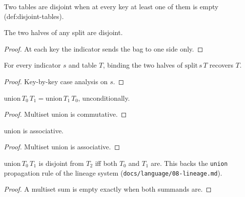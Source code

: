 \begin{definition}
  \label{def:disjoint}\leanok
  Two tables are disjoint when at every key at least one of them is
  empty (def:disjoint-tables).
\end{definition}

\begin{theorem}
  \label{thm:split-disjoint}\leanok
  The two halves of any split are disjoint.
\end{theorem}
\begin{proof}\leanok
  At each key the indicator sends the bag to one side only.
\end{proof}

\begin{theorem}
  \label{thm:union-split}\leanok
  For every indicator $s$ and table $T$, binding the two halves of
  $\mathrm{split}\,s\,T$ recovers $T$.
\end{theorem}
\begin{proof}\leanok
  Key-by-key case analysis on $s$.
\end{proof}

\begin{theorem}
  \label{thm:union-comm}\leanok
  $\mathrm{union}\,T_0\,T_1 = \mathrm{union}\,T_1\,T_0$, unconditionally.
\end{theorem}
\begin{proof}\leanok
  Multiset union is commutative.
\end{proof}

\begin{theorem}
  \label{thm:union-assoc}\leanok
  $\mathrm{union}$ is associative.
\end{theorem}
\begin{proof}\leanok
  Multiset union is associative.
\end{proof}

\begin{theorem}
  \label{thm:union-disjoint-iff}\leanok
  $\mathrm{union}\,T_0\,T_1$ is disjoint from $T_2$ iff both $T_0$ and
  $T_1$ are.  This backs the \texttt{union} propagation rule of the
  lineage system (\texttt{docs/language/08-lineage.md}).
\end{theorem}
\begin{proof}\leanok
  A multiset sum is empty exactly when both summands are.
\end{proof}

